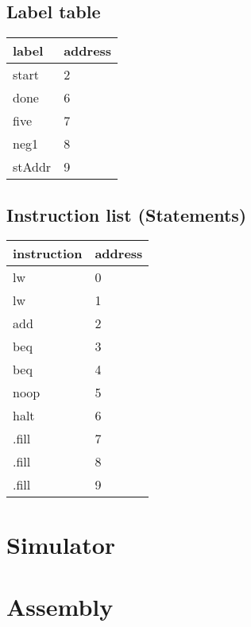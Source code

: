 \documentclass[14pt]{article}
\begin{document}
\subsection{Label table}
\begin{center}
    \begin{tabular}{|C{2cm}|C{3cm}|}
        \hline
        label & address\\
        \hline
        start & 2\\
        \hline
        done & 6\\
        \hline
        five & 7\\
        \hline
        neg1 & 8\\
        \hline
        stAddr & 9\\
        \hline
\end{tabular}
\end{center}
\subsection{Instruction list (Statements)}
\begin{center}
    \begin{tabular}{|C{2cm}|C{3cm}|}
        \hline
        instruction & address\\
        \hline
        lw & 0\\
        \hline
        lw & 1\\
        \hline
        add & 2\\
        \hline
        beq & 3\\
        \hline
        beq & 4\\
        \hline
        noop & 5\\
        \hline
        halt & 6\\
        \hline
        .fill & 7\\
        \hline
        .fill & 8\\
        \hline
        .fill & 9\\
        \hline
\end{tabular}
\end{center}
   


\newpage
\section{Simulator}
  

\newpage
\section{Assembly}
\end{document}
